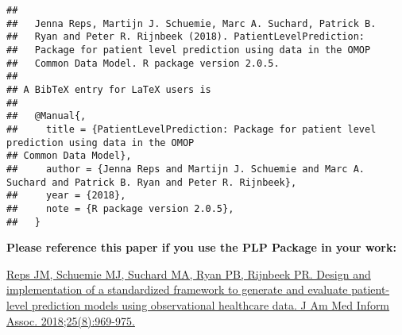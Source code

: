 \documentclass[]{article}
\begin{document}
\begin{verbatim}
## 
##   Jenna Reps, Martijn J. Schuemie, Marc A. Suchard, Patrick B.
##   Ryan and Peter R. Rijnbeek (2018). PatientLevelPrediction:
##   Package for patient level prediction using data in the OMOP
##   Common Data Model. R package version 2.0.5.
## 
## A BibTeX entry for LaTeX users is
## 
##   @Manual{,
##     title = {PatientLevelPrediction: Package for patient level prediction using data in the OMOP
## Common Data Model},
##     author = {Jenna Reps and Martijn J. Schuemie and Marc A. Suchard and Patrick B. Ryan and Peter R. Rijnbeek},
##     year = {2018},
##     note = {R package version 2.0.5},
##   }
\end{verbatim}

\textbf{Please reference this paper if you use the PLP Package in your
work:}

\href{http://dx.doi.org/10.1093/jamia/ocy032}{Reps JM, Schuemie MJ,
Suchard MA, Ryan PB, Rijnbeek PR. Design and implementation of a
standardized framework to generate and evaluate patient-level prediction
models using observational healthcare data. J Am Med Inform Assoc.
2018;25(8):969-975.}
\end{document}
